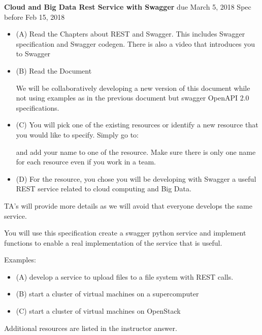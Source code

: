\begin{exercise} {\bf Cloud and Big Data Rest Service with Swagger}
  due March 5, 2018 Spec before Feb 15, 2018

\begin{itemize}
     
\item (A) Read the Chapters about REST and Swagger. This includes
  Swagger specification and Swagger codegen. There is also a video
  that introduces you to Swagger 
 
\item (B) Read the Document
 
  We will be collaboratively developing a new version of this document
  while not using examples as in the previous document but swagger
  OpenAPI 2.0 specifications.
 
\item (C) You will pick one of the existing resources or identify a
  new resource that you would like to specify. Simply go to:


and add your name to one of the resource. Make sure there is only one
name for each resource even if you work in a team.
 
\item (D) For the resource, you chose you will be developing with
  Swagger a useful REST service related to cloud computing and Big
  Data.

 
 \end{itemize}

 TA's will provide more details as we will avoid that everyone
 develops the same service.
 
 You will use this specification create a swagger python service and
 implement functions to enable a real implementation of the service
 that is useful.

 
Examples:

\begin{itemize}
\smallskip
\item (A) develop a service to upload files to a file system with REST calls.

\item (B) start a cluster of virtual machines on a supercomputer

\item (C) start a cluster of virtual machines on OpenStack

\end{itemize}


Additional resources are listed in the instructor answer. 
\end{exercise}

